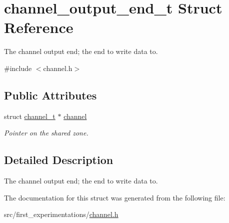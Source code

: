 \hypertarget{structchannel__output__end__t}{\section{channel\-\_\-output\-\_\-end\-\_\-t Struct Reference}
\label{structchannel__output__end__t}
}


The channel output end; the end to write data to.  




{\ttfamily \#include $<$channel.\-h$>$}

\subsection*{Public Attributes}
\begin{DoxyCompactItemize}
\item 
\hypertarget{structchannel__output__end__t_aa4cc28a9fefc5813f797c362ac00facd}{struct \hyperlink{structchannel__t}{channel\-\_\-t} $\ast$ \hyperlink{structchannel__output__end__t_aa4cc28a9fefc5813f797c362ac00facd}{channel}}\label{structchannel__output__end__t_aa4cc28a9fefc5813f797c362ac00facd}

\begin{DoxyCompactList}\small\item\em Pointer on the shared zone. \end{DoxyCompactList}\end{DoxyCompactItemize}


\subsection{Detailed Description}
The channel output end; the end to write data to. 

The documentation for this struct was generated from the following file\-:\begin{DoxyCompactItemize}
\item 
src/first\-\_\-experimentations/\hyperlink{channel_8h}{channel.\-h}\end{DoxyCompactItemize}
